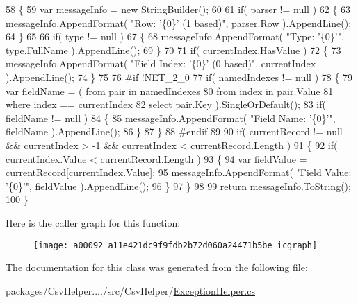 \begin{DoxyCode}
58         \{
59             var messageInfo = \textcolor{keyword}{new} StringBuilder();
60 
61             \textcolor{keywordflow}{if}( parser != null )
62             \{
63                 messageInfo.AppendFormat( \textcolor{stringliteral}{"Row: '\{0\}' (1 based)"}, parser.Row ).AppendLine();
64             \}
65 
66             \textcolor{keywordflow}{if}( type != null )
67             \{
68                 messageInfo.AppendFormat( \textcolor{stringliteral}{"Type: '\{0\}'"}, type.FullName ).AppendLine();
69             \}
70 
71             \textcolor{keywordflow}{if}( currentIndex.HasValue )
72             \{
73                 messageInfo.AppendFormat( \textcolor{stringliteral}{"Field Index: '\{0\}' (0 based)"}, currentIndex ).AppendLine();
74             \}
75 
76 \textcolor{preprocessor}{#if !NET\_2\_0
}
77 \textcolor{preprocessor}{}            \textcolor{keywordflow}{if}( namedIndexes != null )
78             \{
79                 var fieldName = ( from pair in namedIndexes
80                                   from index in pair.Value
81                                   where index == currentIndex
82                                   select pair.Key ).SingleOrDefault();
83                 \textcolor{keywordflow}{if}( fieldName != null )
84                 \{
85                     messageInfo.AppendFormat( \textcolor{stringliteral}{"Field Name: '\{0\}'"}, fieldName ).AppendLine();
86                 \}
87             \}
88 \textcolor{preprocessor}{#endif
}
89 \textcolor{preprocessor}{}
90             \textcolor{keywordflow}{if}( currentRecord != null && currentIndex > -1 && currentIndex < currentRecord.Length )
91             \{
92                 \textcolor{keywordflow}{if}( currentIndex.Value < currentRecord.Length )
93                 \{
94                     var fieldValue = currentRecord[currentIndex.Value];
95                     messageInfo.AppendFormat( \textcolor{stringliteral}{"Field Value: '\{0\}'"}, fieldValue ).AppendLine();
96                 \}
97             \}
98 
99             \textcolor{keywordflow}{return} messageInfo.ToString();
100         \}
\end{DoxyCode}


Here is the caller graph for this function\-:
\nopagebreak
\begin{figure}[H]
\begin{center}
\leavevmode
\texttt{[image: a00092\_a11e421dc9f9fdb2b72d060a24471b5be\_icgraph]}
\end{center}
\end{figure}




The documentation for this class was generated from the following file\-:\begin{DoxyCompactItemize}
\item 
packages/\-Csv\-Helper..../src/\-Csv\-Helper/\hyperlink{a00234}{Exception\-Helper.\-cs}\end{DoxyCompactItemize}
